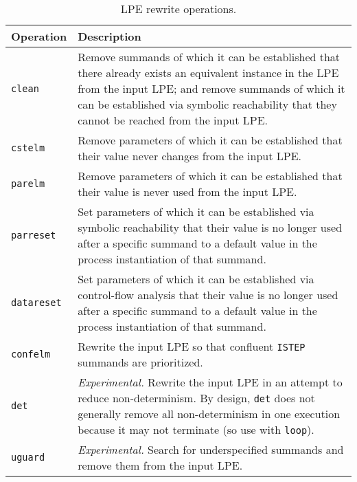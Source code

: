 \begin{table}[!ht]
\begin{center}
\begin{tabularx}{\linewidth}{l|X|}
\textbf{Operation} & \textbf{Description} \\ \hline
\texttt{clean} & Remove summands of which it can be established that there already exists an equivalent instance in the LPE from the input LPE; and remove summands of which it can be established via symbolic reachability that they cannot be reached from the input LPE. \\ \hline
\texttt{cstelm} & Remove parameters of which it can be established that their value never changes from the input LPE. \\ \hline
\texttt{parelm} & Remove parameters of which it can be established that their value is never used from the input LPE. \\ \hline
\texttt{parreset} & Set parameters of which it can be established via symbolic reachability that their value is no longer used after a specific summand to a default value in the process instantiation of that summand. \\ \hline
\texttt{datareset} & Set parameters of which it can be established via control-flow analysis that their value is no longer used after a specific summand to a default value in the process instantiation of that summand. \\ \hline
\texttt{confelm} & Rewrite the input LPE so that confluent \texttt{ISTEP} summands are prioritized. \\ \hline
\texttt{det} & \textit{Experimental.} Rewrite the input LPE in an attempt to reduce non-determinism. By design, \texttt{det} does not generally remove all non-determinism in one execution because it may not terminate (so use with \texttt{loop}). \\ \hline
\texttt{uguard} & \textit{Experimental.} Search for underspecified summands and remove them from the input LPE. \\ \hline
\end{tabularx}
\caption{LPE rewrite operations.}
\label{tab:lperewriteops}
\end{center}
\end{table}

